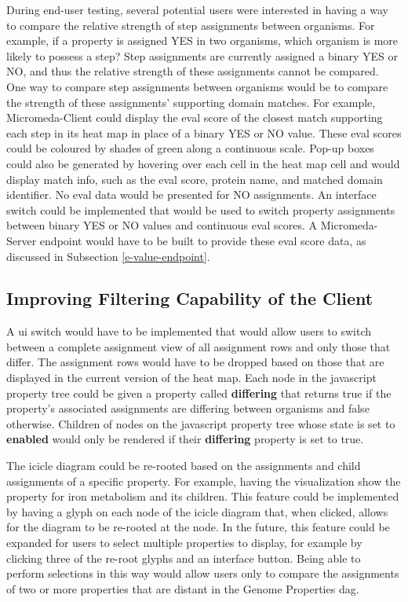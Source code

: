 During end-user testing, several potential users were interested in having a way 
to compare the relative strength of step assignments between organisms. For 
example, if a property is assigned YES in two organisms, which organism is more 
likely to possess a step? Step assignments are currently assigned a binary YES 
or NO, and thus the relative strength of these assignments cannot be compared. 
One way to compare step assignments between organisms would be to compare the 
strength of these assignments' supporting domain matches. For example, 
Micromeda-Client could display the \gls{eval} score of the closest match 
supporting each step in its heat map in place of a binary YES or NO value. These 
\gls{eval} scores could be coloured by shades of green along a continuous scale. 
Pop-up boxes could also be generated by hovering over each cell in the heat map 
cell and would display match info, such as the \gls{eval} score, protein name, 
and matched domain identifier. No \gls{eval} data would be presented for NO 
assignments. An interface switch could be implemented that would be used to 
switch property assignments between binary YES or NO values and continuous 
\gls{eval} scores. A Micromeda-Server endpoint would have to be built to provide 
these \gls{eval} score data, as discussed in Subsection \ref{e-value-endpoint}.

\subsection{Improving Filtering Capability of the Client}

A \gls{ui} switch would have to be implemented that would allow users to switch 
between a complete assignment view of all assignment rows and only those that 
differ. The assignment rows would have to be dropped based on those that are 
displayed in the current version of the heat map. Each node in the 
\gls{javascript} property tree could be given a property called 
\textbf{differing} that returns true if the property's associated assignments 
are differing between organisms and false otherwise. Children of nodes on the 
\gls{javascript} property tree whose state is set to \textbf{enabled} would only 
be rendered if their \textbf{differing} property is set to true.

The icicle diagram could be re-rooted based on the assignments and child 
assignments of a specific property. For example, having the visualization show 
the property for iron metabolism and its children. This feature could be 
implemented by having a glyph on each node of the icicle diagram that, when 
clicked, allows for the diagram to be re-rooted at the node. In the future, this 
feature could be expanded for users to select multiple properties to display, 
for example by clicking three of the re-root glyphs and an interface button. Being 
able to perform selections in this way would allow users only to compare the 
assignments of two or more properties that are distant in the Genome Properties 
\gls{dag}.

